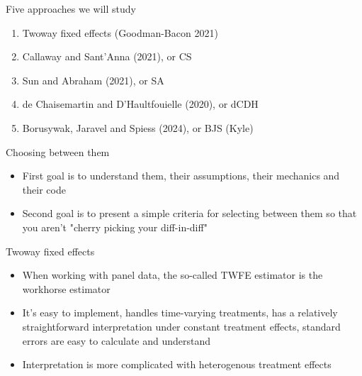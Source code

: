 \documentclass{beamer}
\begin{document}
\begin{frame}{Five approaches we will study}

\begin{enumerate}
\item Twoway fixed effects (Goodman-Bacon 2021)
\item Callaway and Sant'Anna (2021), or CS
\item Sun and Abraham (2021), or SA
\item de Chaisemartin and D'Haultfouielle (2020), or dCDH
\item Borusywak, Jaravel and Spiess (2024), or BJS (Kyle)
\end{enumerate}
\end{frame}

\begin{frame}{Choosing between them}

\begin{itemize}
\item First goal is to understand them, their assumptions, their mechanics and their code
\item Second goal is to present a simple criteria for selecting between them so that you aren't "cherry picking your diff-in-diff"
\end{itemize}

\end{frame}




\begin{frame}{Twoway fixed effects}

\begin{itemize}
\item When working with panel data, the so-called TWFE estimator is the workhorse estimator
\item It's easy to implement, handles time-varying treatments, has a relatively straightforward interpretation under constant treatment effects, standard errors are easy to calculate and understand
\item Interpretation is more complicated with heterogenous treatment effects
\end{itemize}

\end{frame}
\end{document}
